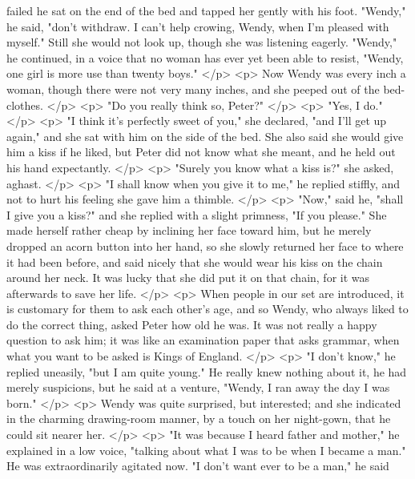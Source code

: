       failed he sat on the end of the bed and tapped her gently with his foot.
      "Wendy," he said, "don't withdraw. I can't help crowing, Wendy, when I'm
      pleased with myself." Still she would not look up, though she was
      listening eagerly. "Wendy," he continued, in a voice that no woman has
      ever yet been able to resist, "Wendy, one girl is more use than twenty
      boys."
    </p>
    <p>
      Now Wendy was every inch a woman, though there were not very many inches,
      and she peeped out of the bed-clothes.
    </p>
    <p>
      "Do you really think so, Peter?"
    </p>
    <p>
      "Yes, I do."
    </p>
    <p>
      "I think it's perfectly sweet of you," she declared, "and I'll get up
      again," and she sat with him on the side of the bed. She also said she
      would give him a kiss if he liked, but Peter did not know what she meant,
      and he held out his hand expectantly.
    </p>
    <p>
      "Surely you know what a kiss is?" she asked, aghast.
    </p>
    <p>
      "I shall know when you give it to me," he replied stiffly, and not to hurt
      his feeling she gave him a thimble.
    </p>
    <p>
      "Now," said he, "shall I give you a kiss?" and she replied with a slight
      primness, "If you please." She made herself rather cheap by inclining her
      face toward him, but he merely dropped an acorn button into her hand, so
      she slowly returned her face to where it had been before, and said nicely
      that she would wear his kiss on the chain around her neck. It was lucky
      that she did put it on that chain, for it was afterwards to save her life.
    </p>
    <p>
      When people in our set are introduced, it is customary for them to ask
      each other's age, and so Wendy, who always liked to do the correct thing,
      asked Peter how old he was. It was not really a happy question to ask him;
      it was like an examination paper that asks grammar, when what you want to
      be asked is Kings of England.
    </p>
    <p>
      "I don't know," he replied uneasily, "but I am quite young." He really
      knew nothing about it, he had merely suspicions, but he said at a venture,
      "Wendy, I ran away the day I was born."
    </p>
    <p>
      Wendy was quite surprised, but interested; and she indicated in the
      charming drawing-room manner, by a touch on her night-gown, that he could
      sit nearer her.
    </p>
    <p>
      "It was because I heard father and mother," he explained in a low voice,
      "talking about what I was to be when I became a man." He was
      extraordinarily agitated now. "I don't want ever to be a man," he said
